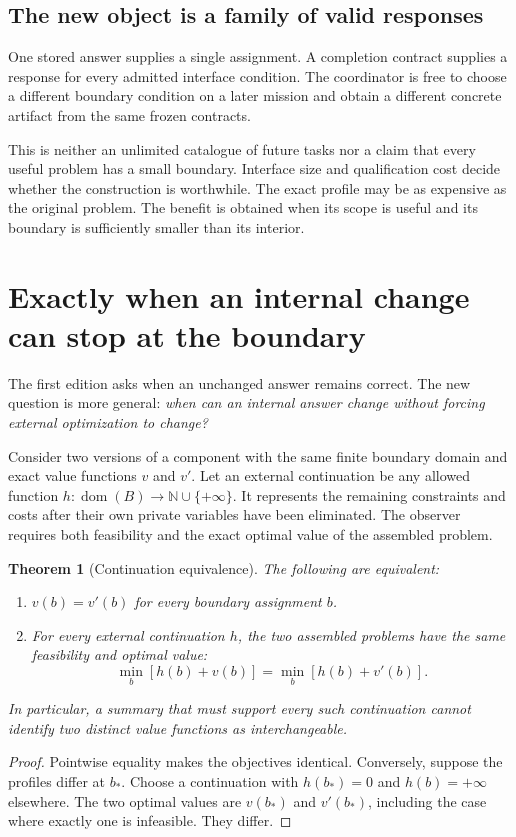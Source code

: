 \documentclass[11pt,letterpaper]{article}
\newtheorem{theorem}{Theorem}[section]
\theoremstyle{definition}\newtheorem{definition}[theorem]{Definition}
\theoremstyle{remark}\newtheorem{remark}[theorem]{Remark}
\newcommand{\NN}{\mathbb N}\newcommand{\RR}{\mathbb R}
\newcommand{\dom}{\operatorname{dom}}\newcommand{\supp}{\operatorname{supp}}
\begin{document}
\subsection{The new object is a family of valid responses}
One stored answer supplies a single assignment. A completion contract supplies a response for every admitted interface condition. The coordinator is free to choose a different boundary condition on a later mission and obtain a different concrete artifact from the same frozen contracts.

This is neither an unlimited catalogue of future tasks nor a claim that every useful problem has a small boundary. Interface size and qualification cost decide whether the construction is worthwhile. The exact profile may be as expensive as the original problem. The benefit is obtained when its scope is useful and its boundary is sufficiently smaller than its interior.

\section{Exactly when an internal change can stop at the boundary}
\label{sec:equivalence}
The first edition asks when an unchanged answer remains correct. The new question is more general: \emph{when can an internal answer change without forcing external optimization to change?}

Consider two versions of a component with the same finite boundary domain and exact value functions $v$ and $v'$. Let an external continuation be any allowed function $h:\dom(B)\to\NN\cup\{+\infty\}$. It represents the remaining constraints and costs after their own private variables have been eliminated. The observer requires both feasibility and the exact optimal value of the assembled problem.

\begin{theorem}[Continuation equivalence]
\label{thm:equivalence}
The following are equivalent:
\begin{enumerate}
\item $v(b)=v'(b)$ for every boundary assignment $b$.
\item For every external continuation $h$, the two assembled problems have the same feasibility and optimal value:
\begin{equation}
 \min_b[h(b)+v(b)]=\min_b[h(b)+v'(b)].
 \label{eq:context}
\end{equation}
\end{enumerate}
In particular, a summary that must support \emph{every} such continuation cannot identify two distinct value functions as interchangeable.
\end{theorem}
\begin{proof}
Pointwise equality makes the objectives identical. Conversely, suppose the profiles differ at $b_*$. Choose a continuation with $h(b_*)=0$ and $h(b)=+\infty$ elsewhere. The two optimal values are $v(b_*)$ and $v'(b_*)$, including the case where exactly one is infeasible. They differ.
\end{proof}
\end{document}
